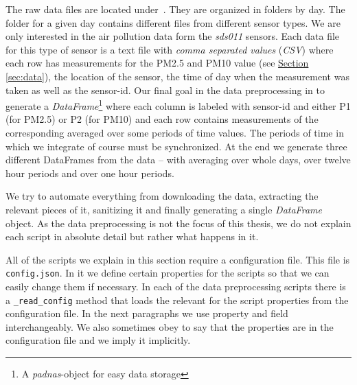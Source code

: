 \documentclass[12pt,a4paper,twoside]{scrartcl}
\numberwithin{equation}{section}
\newcommand{\refsec}[1]{\hyperref[#1]{Section \ref*{#1}}}
\begin{document}
The raw data files are located under~\cite{luftdaten}. They are organized in folders by day. The folder for a given day contains different files from different sensor types. We are only interested in the air pollution data form the \emph{sds011} sensors. Each data file for this type of sensor is a text file with \emph{comma separated values} (\emph{CSV}) where each row has measurements for the PM2.5 and PM10 value (see \refsec{sec:data}), the location of the sensor, the time of day when the measurement was taken as well as the sensor-id. Our final goal in the data preprocessing in to generate a \emph{DataFrame}\footnote{A \emph{padnas}-object for easy data storage} where each column is labeled with sensor-id and either P1 (for PM2.5) or P2 (for PM10) and each row contains measurements of the corresponding averaged over some periods of time values. The periods of time in which we integrate of course must be synchronized. At the end we generate three different DataFrames from the data -- with averaging over whole days, over twelve hour periods and over one hour periods.

We try to automate everything from downloading the data, extracting the relevant pieces of it, sanitizing it and finally generating a single \emph{DataFrame} object. As the data preprocessing is not the focus of this thesis, we do not explain each script in absolute detail but rather what happens in it.

All of the scripts we explain in this section require a configuration file. This file is \texttt{config.json}. In it we define certain properties for the scripts so that we can easily change them if necessary. In each of the data preprocessing scripts there is a \texttt{\_read\_config} method that loads the relevant for the script properties from the configuration file. In the next paragraphs we use property and field interchangeably. We also sometimes obey to say that the properties are in the configuration file and we imply it implicitly.
\end{document}
